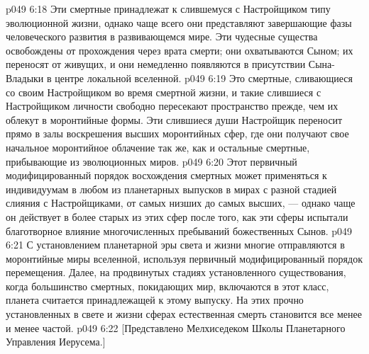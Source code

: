 \vs p049 6:18 \pc {}\bibnobreakspace {} Эти смертные принадлежат к слившемуся с Настройщиком типу эволюционной жизни, однако чаще всего они представляют завершающие фазы человеческого развития в развивающемся мире. Эти чудесные существа освобождены от прохождения через врата смерти; они охватываются Сыном; их переносят от живущих, и они немедленно появляются в присутствии Сына\hyp{}Владыки в центре локальной вселенной.
\vs p049 6:19 Это смертные, сливающиеся со своим Настройщиком во время смертной жизни, и такие слившиеся с Настройщиком личности свободно пересекают пространство прежде, чем их облекут в моронтийные формы. Эти слившиеся души Настройщик переносит прямо в залы воскрешения высших моронтийных сфер, где они получают свое начальное моронтийное облачение так же, как и остальные смертные, прибывающие из эволюционных миров.
\vs p049 6:20 Этот первичный модифицированный порядок восхождения смертных может применяться к индивидуумам в любом из планетарных выпусков в мирах с разной стадией слияния с Настройщиками, от самых низших до самых высших, --- однако чаще он действует в более старых из этих сфер после того, как эти сферы испытали благотворное влияние многочисленных пребываний божественных Сынов.
\vs p049 6:21 С установлением планетарной эры света и жизни многие отправляются в моронтийные миры вселенной, используя первичный модифицированный порядок перемещения. Далее, на продвинутых стадиях установленного существования, когда большинство смертных, покидающих мир, включаются в этот класс, планета считается принадлежащей к этому выпуску. На этих прочно установленных в свете и жизни сферах естественная смерть становится все менее и менее частой.
\vsetoff
\vs p049 6:22 [Представлено Мелхиседеком Школы Планетарного Управления Иерусема.]
